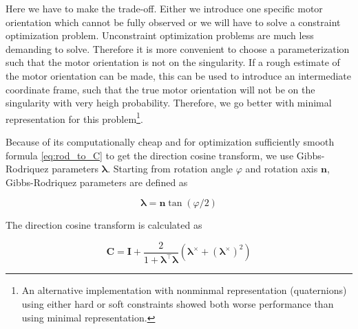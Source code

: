 Here we have to make the trade-off. Either we introduce one specific motor orientation which cannot be fully observed or we will have to solve a constraint optimization problem.
Unconstraint optimization problems are much less demanding to solve.
Therefore it is more convenient to choose a parameterization such that the motor orientation is not on the singularity.
If a rough estimate of the motor orientation can be made, this can be used to introduce an intermediate coordinate frame, such that the true motor orientation will not be on the singularity with very heigh probability.
Therefore, we go better with minimal representation for this problem\footnote{
An alternative implementation with nonminmal representation (quaternions) using either hard or soft constraints showed both worse performance than using minimal representation.
}.

Because of its computationally cheap and for optimization sufficiently smooth formula \eqref{eq:rod_to_C} to get the direction cosine transform, we use Gibbs-Rodriquez parameters $\boldsymbol{\lambda}$. Starting from rotation angle $\varphi$ and rotation axis $\mathbf{n}$, Gibbs-Rodriquez parameters are defined as

\begin{equation}
\boldsymbol{\lambda} = \mathbf{n} \tan(\varphi/2) 
\end{equation}

The direction cosine transform is calculated as

\begin{equation}
\label{eq:rod_to_C}
\mathbf{C} = \mathbf{I} + \frac{2}{1+\boldsymbol{\lambda}^\top \boldsymbol{\lambda}}
\left(\boldsymbol{\lambda}^\times + \left(\boldsymbol{\lambda}^\times\right)^2\right)
\end{equation}

